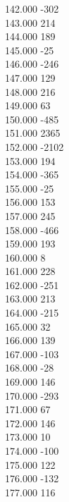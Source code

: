 { 142.000	-302 \\
 143.000	214 \\
 144.000	189 \\
 145.000	-25 \\
 146.000	-246 \\
 147.000	129 \\
 148.000	216 \\
 149.000	63 \\
 150.000	-485 \\
 151.000	2365 \\
 152.000	-2102 \\
 153.000	194 \\
 154.000	-365 \\
 155.000	-25 \\
 156.000	153 \\
 157.000	245 \\
 158.000	-466 \\
 159.000	193 \\
 160.000	8 \\
 161.000	228 \\
 162.000	-251 \\
 163.000	213 \\
 164.000	-215 \\
 165.000	32 \\
 166.000	139 \\
 167.000	-103 \\
 168.000	-28 \\
 169.000	146 \\
 170.000	-293 \\
 171.000	67 \\
 172.000	146 \\
 173.000	10 \\
 174.000	-100 \\
 175.000	122 \\
 176.000	-132 \\
 177.000	116 \\
}
